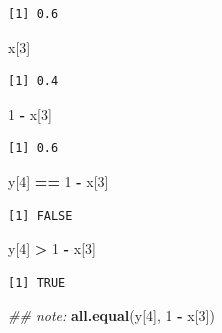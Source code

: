 \documentclass[]{book}
\newenvironment{Shaded}{\begin{snugshade}}{\end{snugshade}}
\newcommand{\CommentTok}[1]{\textcolor[rgb]{0.56,0.35,0.01}{\textit{#1}}}
\newcommand{\DecValTok}[1]{\textcolor[rgb]{0.00,0.00,0.81}{#1}}
\newcommand{\KeywordTok}[1]{\textcolor[rgb]{0.13,0.29,0.53}{\textbf{#1}}}
\newcommand{\NormalTok}[1]{#1}
\newcommand{\OperatorTok}[1]{\textcolor[rgb]{0.81,0.36,0.00}{\textbf{#1}}}
\newcommand{\StringTok}[1]{\textcolor[rgb]{0.31,0.60,0.02}{#1}}
\theoremstyle{definition}
\theoremstyle{definition}
\theoremstyle{definition}
\theoremstyle{remark}
\begin{document}
\begin{verbatim}
[1] 0.6
\end{verbatim}

\begin{Shaded}
\begin{Highlighting}[]
\NormalTok{x[}\DecValTok{3}\NormalTok{]}
\end{Highlighting}
\end{Shaded}

\begin{verbatim}
[1] 0.4
\end{verbatim}

\begin{Shaded}
\begin{Highlighting}[]
\DecValTok{1} \OperatorTok{-}\StringTok{ }\NormalTok{x[}\DecValTok{3}\NormalTok{]}
\end{Highlighting}
\end{Shaded}

\begin{verbatim}
[1] 0.6
\end{verbatim}

\begin{Shaded}
\begin{Highlighting}[]
\NormalTok{y[}\DecValTok{4}\NormalTok{] }\OperatorTok{==}\StringTok{ }\DecValTok{1} \OperatorTok{-}\StringTok{ }\NormalTok{x[}\DecValTok{3}\NormalTok{]}
\end{Highlighting}
\end{Shaded}

\begin{verbatim}
[1] FALSE
\end{verbatim}

\begin{Shaded}
\begin{Highlighting}[]
\NormalTok{y[}\DecValTok{4}\NormalTok{] }\OperatorTok{>}\StringTok{ }\DecValTok{1} \OperatorTok{-}\StringTok{ }\NormalTok{x[}\DecValTok{3}\NormalTok{]}
\end{Highlighting}
\end{Shaded}

\begin{verbatim}
[1] TRUE
\end{verbatim}

\begin{Shaded}
\begin{Highlighting}[]
\CommentTok{## note:}
\KeywordTok{all.equal}\NormalTok{(y[}\DecValTok{4}\NormalTok{], }\DecValTok{1} \OperatorTok{-}\StringTok{ }\NormalTok{x[}\DecValTok{3}\NormalTok{])}
\end{Highlighting}
\end{Shaded}
\end{document}
